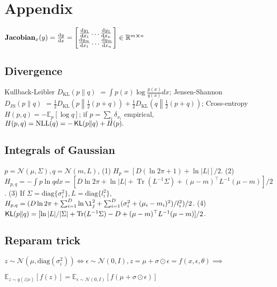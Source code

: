 \section{Appendix}

\makebox[0pt][l]{\smash{\text{\raisebox{-0.7em}{\tiny (numerator layout)}}}}\(\text{\textbf{Jacobian}}_x(y) = \derivative{y}{x} = \begin{bmatrix}
\derivative{y_1}{x_1} \dots \derivative{y_1}{x_n} \\
\makebox[0pt][l]{\smash{\text{\raisebox{1em}{\tiny{\;\;\dots}}}}}\derivative{y_m}{x_1} \dots \makebox[0pt][l]{\smash{\text{\raisebox{1em}{\tiny{\;\;\dots}}}}}\derivative{y_m}{x_n}
\end{bmatrix} \in \mathbb{R}^{m \cross n}\)

\subsection*{Divergence}
Kullback-Leibler $D_{\text{KL}}(p \| q) $ $= \int p(x) \log \frac{p(x)}{q(x)} dx
$; Jensen-Shannon $D_{\text{JS}}(p \| q) $ $= \frac{1}{2} D_{\text{KL}}\left(p \middle\| \frac{1}{2}(p + q)\right) + \frac{1}{2} D_{\text{KL}}\left(q \middle\| \frac{1}{2}(p + q)\right)$; Cross-entropy \(H(p, q)=-\mathbb{E}_{p}[\log q]\); if \(p=\sum_i\delta_{x_i}\) empirical, \(H(p, q) = \mathrm{NLL}(q) = - \operatorname{\mathsf{KL}}(p\|q) + H(p).\)

\subsection*{Integrals of Gaussian}
\(p=\mathcal{N}(\mu, \Sigma),q=\mathcal{N}(m, L)\), (1) \(H_p = [D (\ln 2 \pi+1) + \ln |L|] /2\).
(2) \(H_{p, q} = -\int p \ln q d x = [D \ln 2 \pi + \ln |L|+ \operatorname{Tr}(L^{-1}\Sigma) + (\mu-m)^{\top}L^{-1}(\mu-m)] /2\).
(3) If \(\Sigma = \text{diag}\{\sigma^2_i\},L = \text{diag}\{l^2_i\}\), \(H_{p, q} = (D\ln 2\pi + \sum_{i=1}^{D}\ln \l^2_j +  \sum_{i=1}^{D}(\sigma_i^2 + (\mu_i - m_i)^2) / l_i^2 )/2\).
(4) \(\operatorname{\mathsf{KL}}(p\|q) = [\ln |L|/|\Sigma|+ \operatorname{Tr}(L^{-1}\Sigma) - D + (\mu-m)^{\top}L^{-1}(\mu-m)] /2\).

\subsection*{Reparam trick}
\(z \sim \mathcal{N}(\mu, \text{diag}(\sigma_i^{2})) \Leftrightarrow \epsilon \sim \mathcal{N}(0,I), z=\mu+\sigma \odot \epsilon = f(x, \epsilon, \theta)\)\( \implies\)

\(\mathbb{E}_{z \sim q(z|x)}[f(z)] = \mathbb{E}_{\epsilon \sim \mathcal{N}(0, I)}[f(\mu + \sigma \odot \epsilon)]\)
